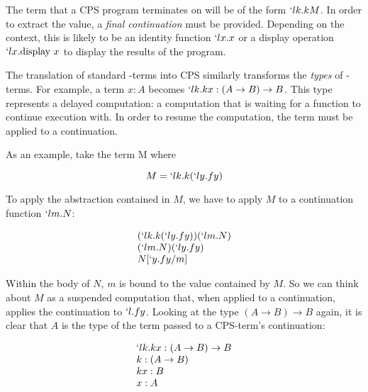   
  The term that a CPS program terminates on will be of the form
  $`lk.kM$. In order to extract the value, a \emph{final continuation}
  must be provided. Depending on the context, this is likely to be an
  identity function $`lx.x$ or a display operation $`lx.\text{display }x$ to
  display the results of the program.
 
  The translation of standard \lam-terms into CPS similarly transforms the 
  \emph{types} of \lam-terms. For example, a term $x : A$ becomes 
  $`lk.kx : (A \to B) \to B$. This type represents a delayed computation:
  a computation that is waiting for a function to continue execution with. 
  In order to resume the computation, the term must be applied to a 
  continuation.
  
  As an example, take the term M where
  
  \[
    M = `lk.k(`ly.fy)
  \]

  To apply the abstraction contained in $M$, we have to apply $M$ to a
  continuation function $`lm.N$:
  
  \[
  \begin{array}{l}
      (`lk.k(`ly.fy))(`lm.N) \\
      (`lm.N)(`ly.fy) \\
      N[`y.fy/m]
  \end{array}
  \]
  
  Within the body of $N$, $m$ is bound to the value contained by $M$.
  So we can think about $M$ as a suspended computation that, when applied
  to a continuation, applies the continuation to $`l.fy$. Looking at
  the type $(A \to B) \to B$ again, it is clear that $A$ is the type
  of the term passed to a CPS-term's continuation:
  
  \[
  \begin{array}{l}
    `lk.kx : (A \to B) \to B \\
    k : (A \to B) \\
    kx : B \\
    x : A \\
  \end{array} 
  \]
  
